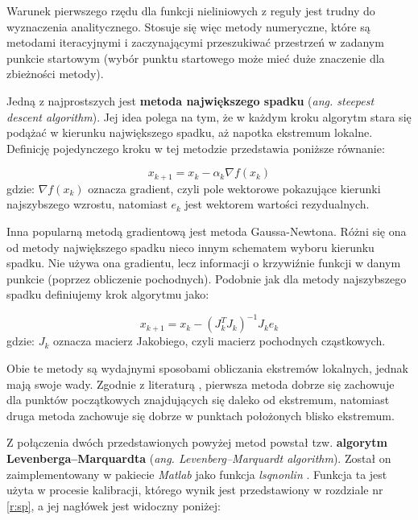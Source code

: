 \documentclass{pracamgr}
\begin{document}
Warunek pierwszego rzędu dla funkcji nieliniowych z reguły
jest trudny do wyznaczenia analitycznego. Stosuje się więc metody numeryczne, które są metodami 
iteracyjnymi i zaczynającymi przeszukiwać przestrzeń w zadanym punkcie startowym (wybór punktu 
startowego może mieć duże znaczenie dla zbieżności metody).

Jedną z najprostszych jest \textbf{metoda największego spadku} 
(\textit{ang. steepest descent algorithm}). Jej idea polega na tym, że w 
każdym kroku algorytm stara się podążać w kierunku największego spadku, aż 
napotka ekstremum lokalne. Definicję pojedynczego kroku w tej metodzie 
przedstawia poniższe równanie:


\begin{equation}
  x_{k+1} = x_k - \alpha_k \nabla f(x_k)
\end{equation}
gdzie: $\nabla f(x_k)$ oznacza gradient, czyli pole wektorowe pokazujące kierunki najszybszego 
wzrostu, natomiast $e_k$ jest wektorem wartości rezydualnych.


Inna popularną metodą gradientową jest metoda Gaussa-Newtona. Różni się ona od metody największego 
spadku nieco innym schematem wyboru kierunku spadku. Nie używa ona gradientu, 
lecz informacji o krzywiźnie funkcji w danym punkcie (poprzez obliczenie pochodnych).
Podobnie jak dla metody najszybszego spadku definiujemy krok algorytmu jako:


\begin{equation}
  x_{k+1} = x_k - (J_k^TJ_k)^{-1}J_k e_k
\end{equation}
gdzie: $J_k$ oznacza macierz Jakobiego, czyli macierz pochodnych cząstkowych.

Obie te metody są wydajnymi sposobami obliczania ekstremów lokalnych, jednak mają swoje wady.
Zgodnie z literaturą \cite{LM}, pierwsza metoda dobrze się zachowuje dla punktów początkowych 
znajdujących się daleko od ekstremum, natomiast druga metoda zachowuje się dobrze w punktach 
położonych blisko ekstremum. 

Z połączenia dwóch przedstawionych powyżej metod powstał tzw. \textbf{algorytm Levenberga–Marquardta} 
(\textit{ang. Levenberg–Marquardt algorithm}). Został on zaimplementowany w pakiecie \textit{Matlab} 
jako funkcja \textit{lsqnonlin} \cite{NonLinear}. Funkcja ta jest użyta w procesie 
kalibracji, którego wynik jest przedstawiony w rozdziale nr \ref{r:sp}, a jej nagłówek 
jest widoczny poniżej:

\end{document}
